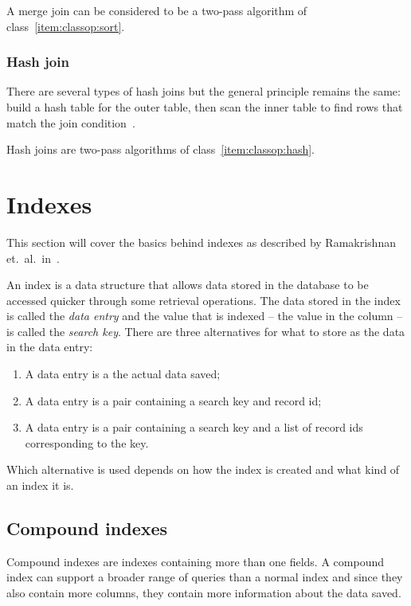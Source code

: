 A merge join can be considered to be a two-pass algorithm of
class~\ref{item:classop:sort}.

\subsubsection{Hash join}
There are several types of hash joins but the general principle remains the
same: build a hash table for the outer table, then scan the inner table to find
rows that match the join condition~\cite[p.
732-738]{garcia-molina_2002_database_dstcb}.

Hash joins are two-pass algorithms of class~\ref{item:classop:hash}.

\section{Indexes}
This section will cover the basics behind indexes as described by Ramakrishnan
et.\ al.\ in~\cite[Ch. 8]{ramakrishnan_2003_database_dms}.

An index is a data structure that allows data stored in the database to be
accessed quicker through some retrieval operations. The data stored in the index
is called the \textit{data entry} and the value that is indexed – the value in
the column – is called the \textit{search key}. There are three alternatives for
what to store as the data in the data entry:

\begin{enumerate}
\item\label{item:indexes:alt1} A data entry is a the actual data saved;
\item\label{item:indexes:alt2} A data entry is a pair containing a search key
  and record id;
\item\label{item:indexes:alt3} A data entry is a pair containing a search key
  and a list of record ids corresponding to the key.
\end{enumerate}

Which alternative is used depends on how the index is created and what kind of
an index it is.

\subsection{Compound indexes}
Compound indexes are indexes containing more than one fields. A compound index
can support a broader range of queries than a normal index and since they also
contain more columns, they contain more information about the data saved.

